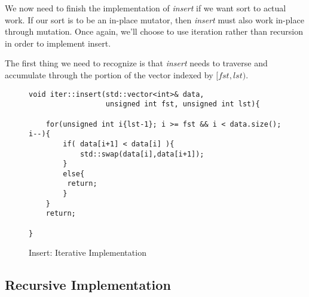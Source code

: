 \documentclass[]{tufte-handout}
\begin{document}
We now need to finish the implementation of \textit{insert} if we want sort to actual work. If our sort is to be an in-place mutator, then \textit{insert} must also work in-place through mutation. Once again, we'll choose to use iteration rather than recursion in order to implement insert. 

The first thing we need to recognize is that \textit{insert} needs to traverse and accumulate through the portion of the vector indexed by $[fst,lst)$. 


\begin{figure}
\begin{lstlisting}
void iter::insert(std::vector<int>& data,
	    		  unsigned int fst, unsigned int lst){

	for(unsigned int i{lst-1}; i >= fst && i < data.size(); i--){
    	if( data[i+1] < data[i] ){
			std::swap(data[i],data[i+1]);
      	}
      	else{
		 return;
        }
    }
    return;
    
}
\end{lstlisting}
\label{code:insertiter}
\caption{Insert: Iterative Implementation}
\end{figure}





\subsection{Recursive Implementation}
\end{document}
